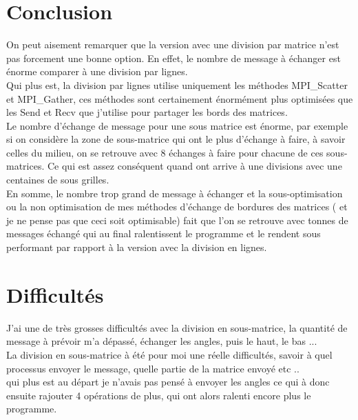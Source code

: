 \documentclass[10pt,a4paper]{article}
\begin{document}
\section{Conclusion}
On peut aisement remarquer que la version avec une division par matrice n'est pas forcement une bonne option. En effet, le nombre de message à échanger est énorme comparer à une division par lignes.\\
Qui plus est, la division par lignes utilise uniquement les méthodes MPI\_Scatter et MPI\_Gather, ces méthodes sont certainement énormément plus optimisées que les Send et Recv que j'utilise pour partager les bords des matrices.\\
Le nombre d'échange de message pour une sous matrice est énorme, par exemple si on considère la zone de sous-matrice qui ont le plus d'échange à faire, à savoir celles du milieu, on se retrouve avec 8 échanges à faire pour chacune de ces sous-matrices. Ce qui est assez conséquent quand ont arrive à une divisions avec une centaines de sous grilles.\\

En somme, le nombre trop grand de message à échanger et la sous-optimisation ou la non optimisation de mes méthodes d'échange de bordures des matrices ( et je ne pense pas que ceci soit optimisable) fait que l'on se retrouve avec tonnes de messages échangé qui au final ralentissent le programme et le rendent sous performant par rapport à la version avec la division en lignes. \\

\section{Difficultés}
J'ai une de très grosses difficultés avec la division en sous-matrice, la quantité de message à prévoir m'a dépassé, échanger les angles, puis le haut, le bas ...\\
La division en sous-matrice à été pour moi une réelle difficultés, savoir à quel processus envoyer le message, quelle partie de la matrice envoyé etc ..\\
qui plus est au départ je n'avais pas pensé à envoyer les angles ce qui à donc ensuite rajouter 4 opérations de plus, qui ont alors ralenti encore plus le programme.
\end{document}
